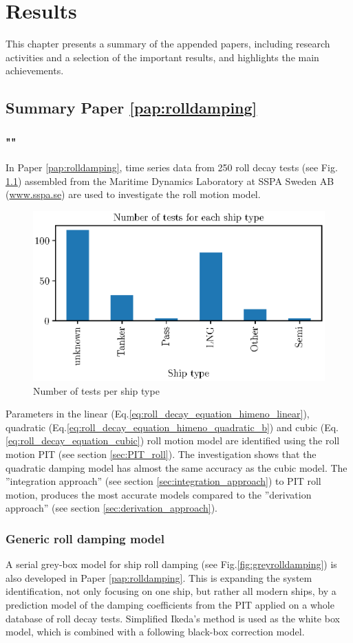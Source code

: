 \chapter{Results\label{ch:results}}
This chapter presents a summary of the appended papers, including research activities
and a selection of the important results, and highlights the main achievements.

\section{Summary Paper \ref{pap:rolldamping}}
\subsection*{""}
In Paper \ref{pap:rolldamping}, time series data from 250 roll decay tests (see Fig. \ref{fig:ship_types}) assembled from the Maritime Dynamics Laboratory at SSPA Sweden AB (\href{www.sspa.se}{www.sspa.se}) are used to investigate the roll motion model. 

\begin{figure}[H]
    \centering
    \includegraphics[width=0.5\columnwidth]{kappa/images/ship_types.eps}
    \caption{Number of tests per ship type}
    \label{fig:ship_types}
\end{figure}

\noindent Parameters in the linear (Eq.\ref{eq:roll_decay_equation_himeno_linear}), quadratic (Eq.\ref{eq:roll_decay_equation_himeno_quadratic_b}) and cubic (Eq.\ref{eq:roll_decay_equation_cubic}) roll motion model are identified using the roll motion PIT (see section \ref{sec:PIT_roll}). The investigation shows that the quadratic damping model has almost the same accuracy as the cubic model. The ''integration approach'' (see section \ref{sec:integration_approach}) to PIT roll motion, produces the most accurate models compared to the ''derivation approach'' (see section \ref{sec:derivation_approach}).

\subsection{Generic roll damping model}
\label{sec:genericrolldampingmodel}
A serial grey-box model for ship roll damping (see Fig.\ref{fig:greyrolldamping}) is also developed in Paper \ref{pap:rolldamping}. 
This is expanding the system identification, not only focusing on one ship, but rather all modern ships, by a prediction model of the damping coefficients from the PIT applied on a whole database of roll decay tests. 
Simplified Ikeda's method \cite{kawahara_simple_2011} is used as the white box model, which is combined with a following black-box correction model.

